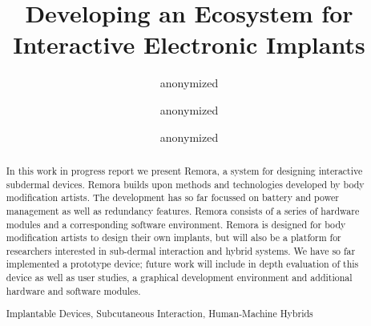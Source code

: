 \documentclass[runningheads,a4paper]{llncs}
\newcommand{\keywords}[1]{\par\addvspace\baselineskip
\noindent\keywordname\enspace\ignorespaces#1}
\begin{document}
\mainmatter  %

\title{Developing an Ecosystem for Interactive
Electronic Implants}


%
%
\author{anonymized
\and anonymized
\and anonymized}
%

%
%

\maketitle


\begin{abstract}

In this work in progress report we present Remora, a system for designing interactive subdermal devices. Remora builds upon methods and technologies developed by body modification artists. The development has so far focussed on battery and power management as well as redundancy features. Remora consists of a series of hardware modules and a corresponding software environment. Remora is designed for body modification artists to design their own implants, but will also be a platform for researchers interested in sub-dermal interaction and hybrid systems. We have so far implemented a prototype device; future work will include in depth evaluation of this device as well as user studies, a graphical development environment and additional hardware and software modules.

\keywords{Implantable Devices, Subcutaneous Interaction, Human-Machine Hybrids}
\end{abstract}
\end{document}
